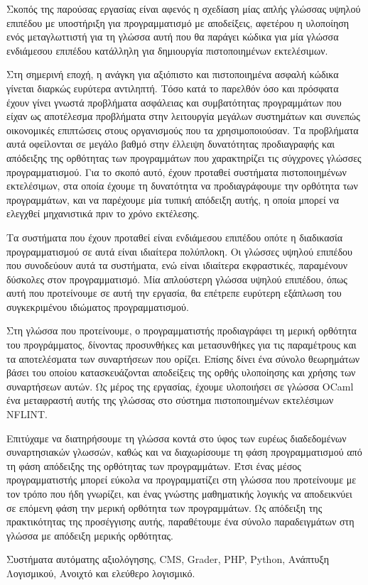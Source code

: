 \documentclass[diploma]{softlab-thesis}
\begin{document}
\begin{abstractgr}%
  Σκοπός της παρούσας εργασίας είναι αφενός η σχεδίαση μίας απλής
  γλώσσας υψηλού επιπέδου με υποστήριξη για προγραμματισμό με
  αποδείξεις, αφετέρου η υλοποίηση ενός μεταγλωττιστή για τη γλώσσα
  αυτή που θα παράγει κώδικα για μία γλώσσα ενδιάμεσου επιπέδου
  κατάλληλη για δημιουργία πιστοποιημένων εκτελέσιμων.

  Στη σημερινή εποχή, η ανάγκη για αξιόπιστο και πιστοποιημένα ασφαλή
  κώδικα γίνεται διαρκώς ευρύτερα αντιληπτή. Τόσο κατά το παρελθόν όσο
  και πρόσφατα έχουν γίνει γνωστά προβλήματα ασφάλειας και
  συμβατότητας προγραμμάτων που είχαν ως αποτέλεσμα προβλήματα στην
  λειτουργία μεγάλων συστημάτων και συνεπώς οικονομικές επιπτώσεις
  στους οργανισμούς που τα χρησιμοποιούσαν. Τα προβλήματα αυτά
  οφείλονται σε μεγάλο βαθμό στην έλλειψη δυνατότητας προδιαγραφής και
  απόδειξης της ορθότητας των προγραμμάτων που χαρακτηρίζει τις
  σύγχρονες γλώσσες προγραμματισμού. Για το σκοπό αυτό, έχουν προταθεί
  συστήματα πιστοποιημένων εκτελέσιμων, στα οποία έχουμε τη δυνατότητα
  να προδιαγράφουμε την ορθότητα των προγραμμάτων, και να παρέχουμε
  μία τυπική απόδειξη αυτής, η οποία μπορεί να ελεγχθεί μηχανιστικά
  πριν το χρόνο εκτέλεσης.

  Τα συστήματα που έχουν προταθεί είναι ενδιάμεσου επιπέδου οπότε η
  διαδικασία προγραμματισμού σε αυτά είναι ιδιαίτερα πολύπλοκη. Οι
  γλώσσες υψηλού επιπέδου που συνοδεύουν αυτά τα συστήματα, ενώ είναι
  ιδιαίτερα εκφραστικές, παραμένουν δύσκολες στον προγραμματισμό.  Μία
  απλούστερη γλώσσα υψηλού επιπέδου, όπως αυτή που προτείνουμε σε αυτή
  την εργασία, θα επέτρεπε ευρύτερη εξάπλωση του συγκεκριμένου
  ιδιώματος προγραμματισμού.

  Στη γλώσσα που προτείνουμε, ο προγραμματιστής προδιαγράφει τη μερική
  ορθότητα του προγράμματος, δίνοντας προσυνθήκες και μετασυνθήκες για
  τις παραμέτρους και τα αποτελέσματα των συναρτήσεων που ορίζει.
  Επίσης δίνει ένα σύνολο θεωρημάτων βάσει του οποίου κατασκευάζονται
  αποδείξεις της ορθής υλοποίησης και χρήσης των συναρτήσεων αυτών. Ως
  μέρος της εργασίας, έχουμε υλοποιήσει σε γλώσσα OCaml ένα
  μεταφραστή αυτής της γλώσσας στο σύστημα πιστοποιημένων
  εκτελέσιμων NFLINT.

  Επιτύχαμε να διατηρήσουμε τη γλώσσα κοντά στο ύφος των ευρέως
  διαδεδομένων συναρτησιακών γλωσσών, καθώς και να διαχωρίσουμε τη
  φάση προγραμματισμού από τη φάση απόδειξης της ορθότητας των
  προγραμμάτων. Έτσι ένας μέσος προγραμματιστής μπορεί εύκολα να
  προγραμματίζει στη γλώσσα που προτείνουμε με τον τρόπο που ήδη
  γνωρίζει, και ένας γνώστης μαθηματικής λογικής να αποδεικνύει σε
  επόμενη φάση την μερική ορθότητα των προγραμμάτων. Ως απόδειξη της
  πρακτικότητας της προσέγγισης αυτής, παραθέτουμε ένα σύνολο
  παραδειγμάτων στη γλώσσα με απόδειξη μερικής ορθότητας.

\begin{keywordsgr}
Συστήματα αυτόματης αξιολόγησης, CMS, Grader, PHP, Python, Ανάπτυξη Λογισμικού,
Ανοιχτό και ελεύθερο λογισμικό.
\end{keywordsgr}
\end{abstractgr}
\end{document}
